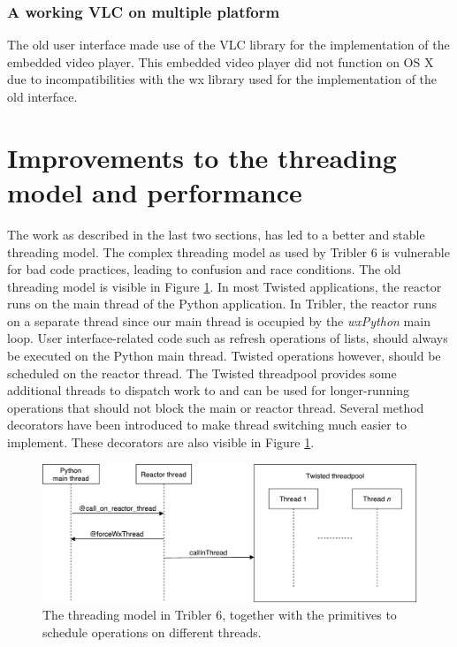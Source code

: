 \subsubsection{\textbf{A working VLC on multiple platform}}
The old user interface made use of the VLC library for the implementation of the embedded video player. This embedded video player did not function on OS X due to incompatibilities with the wx library used for the implementation of the old interface.

\section{Improvements to the threading model and performance}
The work as described in the last two sections, has led to a better and stable threading model. The complex threading model as used by Tribler 6 is vulnerable for bad code practices, leading to confusion and race conditions. The old threading model is visible in Figure \ref{fig:old-threading-model}. In most Twisted applications, the reactor runs on the main thread of the Python application. In Tribler, the reactor runs on a separate thread since our main thread is occupied by the \emph{wxPython} main loop. User interface-related code such as refresh operations of lists, should always be executed on the Python main thread. Twisted operations however, should be scheduled on the reactor thread. The Twisted threadpool provides some additional threads to dispatch work to and can be used for longer-running operations that should not block the main or reactor thread. Several method decorators have been introduced to make thread switching much easier to implement. These decorators are also visible in Figure \ref{fig:old-threading-model}.\\

\begin{figure}[h!]
	\centering
	\includegraphics[width=0.9\columnwidth]{images/improving_qa/threading_model_tribler}
	\caption{The threading model in Tribler 6, together with the primitives to schedule operations on different threads.}
	\label{fig:old-threading-model}
\end{figure}

